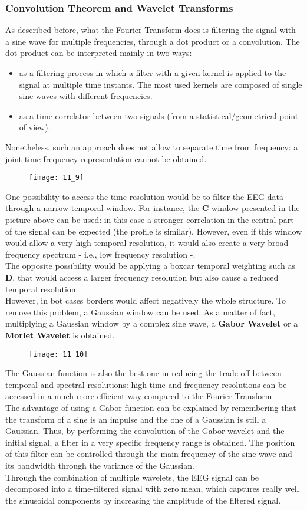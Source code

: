 \subsubsection{Convolution Theorem and Wavelet Transforms}
As described before, what the Fourier Transform does is filtering the signal with a sine wave for multiple
frequencies, through a dot product or a convolution. The dot product can be interpreted mainly in two ways:
\begin{itemize}
    \item as a filtering process in which a filter with a given kernel is applied to the signal at multiple
          time instants. The most used kernels are composed of single sine waves with different frequencies.
    \item as a time correlator between two signals (from a statistical/geometrical point of view).
\end{itemize}
Nonetheless, such an approach does not allow to separate time from frequency: a joint time-frequency
representation cannot be obtained.
\begin{figure}[H]
    \texttt{[image: 11\_9]}
    \centering
\end{figure}
One possibility to access the time resolution would be to filter the EEG data through a narrow temporal window.
For instance, the \textbf{C} window presented in the picture above can be used: in this case a stronger
correlation in the central part of the signal can be expected (the profile is similar). However, even if this
window would allow a very high temporal resolution, it would also create a very broad frequency spectrum - i.e.,
low frequency resolution -.\\
The opposite possibility would be applying a boxcar temporal weighting such as \textbf{D}, that would access a
larger frequency resolution but also cause a reduced temporal resolution.\\
However, in bot cases borders would affect negatively the whole structure. To remove this problem, a Gaussian
window can be used. As a matter of fact, multiplying a Gaussian window by a complex sine wave, a 
\textbf{Gabor Wavelet} or a \textbf{Morlet Wavelet} is obtained.
\begin{figure}[H]
    \texttt{[image: 11\_10]}
    \centering
\end{figure}
The Gaussian function is also the best one in reducing the trade-off between
temporal and spectral resolutions: high time and frequency resolutions can be accessed in a much more efficient
way compared to the Fourier Transform.\\
The advantage of using a Gabor function can be explained by remembering that the transform of a sine is an
impulse and the one of a Gaussian is still a Gaussian. Thus, by performing the convolution of the Gabor wavelet
and the initial signal, a filter in a very specific frequency range is obtained. The position of this filter
can be controlled through the main frequency of the sine wave and its bandwidth through the variance of the Gaussian.\\
Through the combination of multiple wavelets, the EEG signal can be decomposed into a time-filtered signal
with zero mean, which captures really well the sinusoidal components by increasing the amplitude of the filtered
signal.
